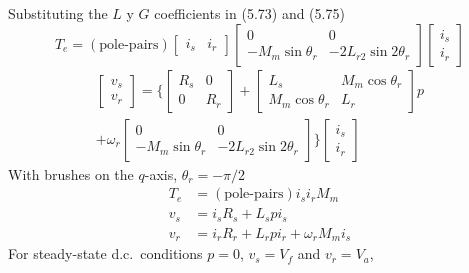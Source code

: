 \documentclass[a4paper,numbers=noenddot,12pt]{scrbook}
\begin{document}
        Substituting the $L$ y $G$ coefficients in (5.73) and (5.75)
        \begin{equation}
            T_e = (\text{pole-pairs}) 
            \begin{bmatrix}
                i_s & i_r
            \end{bmatrix}
            \begin{bmatrix}
                0 & 0 \\
                - M_m \sin \theta_r & - 2 L_{r2} \sin 2 \theta_r
            \end{bmatrix}
            \begin{bmatrix}
                i_s \\ i_r
            \end{bmatrix}
        \end{equation}
        \begin{multline}
            \begin{bmatrix}
                v_s \\ v_r
            \end{bmatrix} = 
            \Bigg \{
                \begin{bmatrix}
                    R_s & 0 \\ 0 & R_r
                \end{bmatrix}
                +
                \begin{bmatrix}
                    L_s & M_m \cos \theta_r \\
                    M_m \cos \theta_r & L_r
                \end{bmatrix}
                p \\
                + \omega_r
                \begin{bmatrix}
                    0 & 0 \\
                    -M_m \sin \theta_r & -2 L_{r2} \sin 2 \theta_r
                \end{bmatrix}
            \Bigg\}
            \begin{bmatrix}
                i_s \\ i_r
            \end{bmatrix}
        \end{multline}
        With brushes on the $q$-axis, $\theta_r = -\pi/2$
        \begin{align*}
            T_e & = (\text{pole-pairs}) i_s i_r M_m \\
            v_s & = i_s R_s + L_s p i_s \\
            v_r & = i_r R_r + L_r p i_r + \omega_r M_m i_s
        \end{align*}
        For steady-state d.c.\ conditions $p = 0$, $v_s=V_f$ and $v_r = V_a$,
\end{document}
